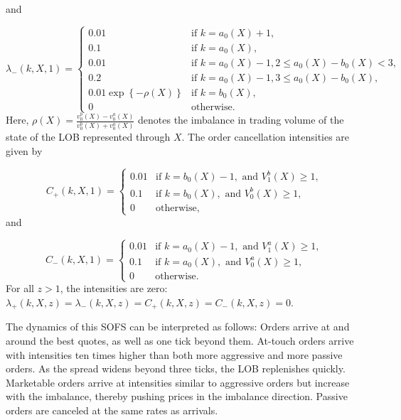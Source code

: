 \documentclass[10pt,a4paper,oneside]{article}
\begin{document}
and

\[
    \lambda_-(k, X, 1) =
    \begin{cases}
        0.01                                 & \text{if } k = a_0(X) + 1,                             \\
        0.1                                  & \text{if } k = a_0(X),                                 \\
        0.01                                 & \text{if } k = a_0(X) - 1, 2 \leq a_0(X) - b_0(X) < 3, \\
        0.2                                  & \text{if } k = a_0(X) - 1, 3 \leq a_0(X) - b_0(X),     \\
        0.01 \exp \left\{ - \rho(X) \right\} & \text{if } k = b_0(X),                                 \\
        0                                    & \text{otherwise.}
    \end{cases}
\]
Here, $\rho(X) = \frac{v^b_0(X) - v^a_0(X)}{v^b_0(X) + v^a_0(X)}$ denotes the imbalance in trading volume of the state of the LOB represented through $X$. The order cancellation intensities are given by

\[
    C_+(k, X, 1) =
    \begin{cases}
        0.01 & \text{if } k = b_0(X) - 1, \text{ and } V^b_1(X) \geq 1, \\
        0.1  & \text{if } k = b_0(X), \text{ and } V^b_0(X) \geq 1,     \\
        0    & \text{otherwise,}
    \end{cases}
\]
and

\[
    C_-(k, X, 1) =
    \begin{cases}
        0.01 & \text{if } k = a_0(X) - 1, \text{ and } V^a_1(X) \geq 1, \\
        0.1  & \text{if } k = a_0(X), \text{ and }  V^a_0(X) \geq 1 ,   \\
        0    & \text{otherwise.}
    \end{cases}
\]
For all $z > 1$, the intensities are zero: $\lambda_+(k, X, z) = \lambda_-(k, X, z) = C_+(k, X, z) = C_-(k, X, z) = 0$.

The dynamics of this SOFS can be interpreted as follows: Orders arrive at and around the best quotes, as well as one tick beyond them. At-touch orders arrive with intensities ten times higher than both more aggressive and more passive orders. As the spread widens beyond three ticks, the LOB replenishes quickly. Marketable orders arrive at intensities similar to aggressive orders but increase with the imbalance, thereby pushing prices in the imbalance direction. Passive orders are canceled at the same rates as arrivals.
\end{document}
